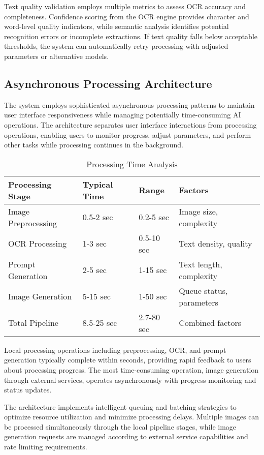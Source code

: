 Text quality validation employs multiple metrics to assess OCR accuracy and completeness. Confidence scoring from the OCR engine provides character and word-level quality indicators, while semantic analysis identifies potential recognition errors or incomplete extractions. If text quality falls below acceptable thresholds, the system can automatically retry processing with adjusted parameters or alternative models.

\subsection{Asynchronous Processing Architecture}

The system employs sophisticated asynchronous processing patterns to maintain user interface responsiveness while managing potentially time-consuming AI operations. The architecture separates user interface interactions from processing operations, enabling users to monitor progress, adjust parameters, and perform other tasks while processing continues in the background.

\begin{table}[H]
\centering
\small
\caption{Processing Time Analysis}
\label{tab:processing_times}
\begin{tabular}{llll}
\toprule
\textbf{Processing Stage} & \textbf{Typical Time} & \textbf{Range} & \textbf{Factors} \\
\midrule
Image Preprocessing & 0.5-2 sec & 0.2-5 sec & Image size, complexity \\
OCR Processing & 1-3 sec & 0.5-10 sec & Text density, quality \\
Prompt Generation & 2-5 sec & 1-15 sec & Text length, complexity \\
Image Generation & 5-15 sec & 1-50 sec & Queue status, parameters \\
Total Pipeline & 8.5-25 sec & 2.7-80 sec & Combined factors \\
\bottomrule
\end{tabular}
\end{table}

Local processing operations including preprocessing, OCR, and prompt generation typically complete within seconds, providing rapid feedback to users about processing progress. The most time-consuming operation, image generation through external services, operates asynchronously with progress monitoring and status updates.

The architecture implements intelligent queuing and batching strategies to optimize resource utilization and minimize processing delays. Multiple images can be processed simultaneously through the local pipeline stages, while image generation requests are managed according to external service capabilities and rate limiting requirements.

